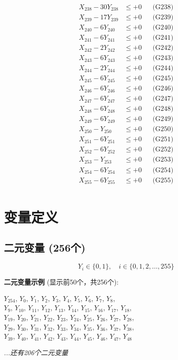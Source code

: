 \documentclass[a4paper,10pt]{article}
\begin{document}
{\begin{align}
X_{238} - 30Y_{238} &\leq +0 && \text{(G238)} \\
X_{239} - 17Y_{239} &\leq +0 && \text{(G239)} \\
X_{240} - 6Y_{240} &\leq +0 && \text{(G240)} \\
X_{241} - 6Y_{241} &\leq +0 && \text{(G241)} \\
X_{242} - 2Y_{242} &\leq +0 && \text{(G242)} \\
X_{243} - 6Y_{243} &\leq +0 && \text{(G243)} \\
X_{244} - 2Y_{244} &\leq +0 && \text{(G244)} \\
X_{245} - 6Y_{245} &\leq +0 && \text{(G245)} \\
X_{246} - 6Y_{246} &\leq +0 && \text{(G246)} \\
X_{247} - 6Y_{247} &\leq +0 && \text{(G247)} \\
\allowbreak
X_{248} - 6Y_{248} &\leq +0 && \text{(G248)} \\
X_{249} - 6Y_{249} &\leq +0 && \text{(G249)} \\
X_{250} - Y_{250} &\leq +0 && \text{(G250)} \\
X_{251} - 6Y_{251} &\leq +0 && \text{(G251)} \\
X_{252} - 6Y_{252} &\leq +0 && \text{(G252)} \\
X_{253} - Y_{253} &\leq +0 && \text{(G253)} \\
X_{254} - 6Y_{254} &\leq +0 && \text{(G254)} \\
X_{255} - 6Y_{255} &\leq +0 && \text{(G255)} \\
\end{align}
}

\section{变量定义}

\subsection{二元变量 (256个)}

\begin{equation}
Y_i \in \{0,1\}, \quad i \in \{0, 1, 2, \ldots, 255\}
\end{equation}

\textbf{二元变量示例} (显示前50个，共256个):

{\small
$Y_{254}$, $Y_{0}$, $Y_{1}$, $Y_{2}$, $Y_{3}$, $Y_{4}$, $Y_{5}$, $Y_{6}$, $Y_{7}$, $Y_{8}$, \\
$Y_{9}$, $Y_{10}$, $Y_{11}$, $Y_{12}$, $Y_{13}$, $Y_{14}$, $Y_{15}$, $Y_{16}$, $Y_{17}$, $Y_{18}$, \\
$Y_{19}$, $Y_{20}$, $Y_{21}$, $Y_{22}$, $Y_{23}$, $Y_{24}$, $Y_{25}$, $Y_{26}$, $Y_{27}$, $Y_{28}$, \\
$Y_{29}$, $Y_{30}$, $Y_{31}$, $Y_{32}$, $Y_{33}$, $Y_{34}$, $Y_{35}$, $Y_{36}$, $Y_{37}$, $Y_{38}$, \\
$Y_{39}$, $Y_{40}$, $Y_{41}$, $Y_{42}$, $Y_{43}$, $Y_{44}$, $Y_{45}$, $Y_{46}$, $Y_{47}$, $Y_{48}$

\textit{...还有206个二元变量}
}
\end{document}
